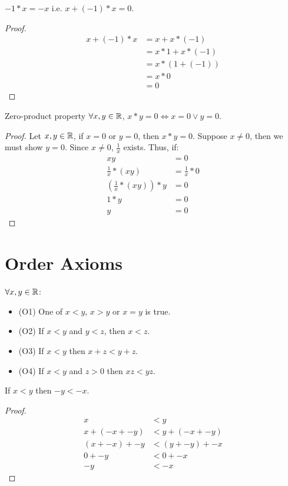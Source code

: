 \begin{theorem}{}{}
    $-1 * x = -x$ i.e. $x + (-1) * x = 0$.
\end{theorem}
\begin{proof}
    \begin{align*}
        x + (-1) * x &= x + x * (-1) \\
        &= x * 1 + x * (-1) \\
        &= x * (1 + (-1)) \\
        &= x * 0 \\
        &= 0
    \end{align*}
\end{proof}

\begin{theorem}{Zero-product property}{}
    $\forall x, y \in \mathbb{R}$, $x * y = 0 \iff x = 0 \lor y = 0$.
\end{theorem}
\begin{proof}
    Let $x, y \in \mathbb{R}$, if $x = 0$ or $y = 0$, then $x * y = 0$. Suppose $x \neq 0$, then we must show $y = 0$. Since $x \neq 0$, $\frac{1}{x}$ exists. Thus, if:
    \begin{align*}
        xy &= 0 \\
        \frac{1}{x} * (xy) &= \frac{1}{x} * 0 \\
        (\frac{1}{x} * (xy)) * y &= 0 \\
        1 * y &= 0 \\
        y &= 0
    \end{align*}
\end{proof}

\section{Order Axioms} $\forall x, y \in \mathbb{R}$:
\begin{itemize}
    \item (O1) One of $x < y$, $x > y$ or $x = y$ is true.
    \item (O2) If $x < y$ and $y < z$, then $x < z$.
    \item (O3) If $x < y$ then $x + z < y + z$.
    \item (O4) If $x < y$ and $z > 0$ then $xz < yz$.
\end{itemize}

\begin{theorem}{}{}
    If $x < y$ then $-y < -x$.
\end{theorem}
\begin{proof}
    \begin{align*}
        x &< y \\
        x + (-x + -y) &< y + (-x + -y) \\
        (x + -x) + -y &< (y + -y) + -x \\
        0 + -y &< 0 + -x \\
        -y &< -x
    \end{align*}
\end{proof}

